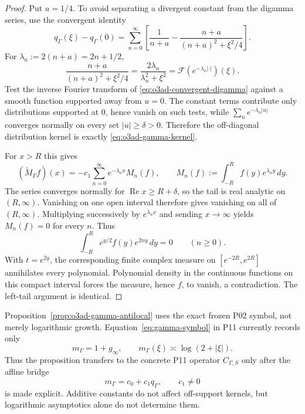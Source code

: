 \begin{proof}
Put \(a=1/4\).  To avoid separating a divergent constant from the digamma series, use
the convergent identity
\[
 q_\Gamma(\xi)-q_\Gamma(0)
 =\sum_{n=0}^\infty
 \left[
 \frac1{n+a}
 -\frac{n+a}{(n+a)^2+\xi^2/4}
 \right].
\tag{O3AD.3}\label{eq:o3ad-convergent-digamma}
\]
For \(\lambda_n:=2(n+a)=2n+1/2\),
\[
 \frac{n+a}{(n+a)^2+\xi^2/4}
 =\frac{2\lambda_n}{\lambda_n^2+\xi^2}
 =\mathcal F(e^{-\lambda_n|\cdot|})(\xi).
\]
Test the inverse Fourier transform of
\eqref{eq:o3ad-convergent-digamma} against a smooth function supported away from
\(u=0\).  The constant terms contribute only distributions supported at \(0\), hence
vanish on such tests, while
\(\sum_n e^{-\lambda_n|u|}\) converges normally on every set \(|u|\ge\delta>0\).
Therefore the off-diagonal distribution kernel is exactly
\eqref{eq:o3ad-gamma-kernel}.

For \(x>R\) this gives
\[
 (\widetilde M_\Gamma f)(x)
 =-c_1\sum_{n=0}^\infty e^{-\lambda_nx}M_n(f),
 \qquad
 M_n(f):=\int_{-R}^{R}f(y)e^{\lambda_ny}\,dy.
\tag{O3AD.4}\label{eq:o3ad-moment-tail}
\]
The series converges normally for \(\operatorname{Re}x\ge R+\delta\), so the tail is
real analytic on \((R,\infty)\).  Vanishing on one open interval therefore gives
vanishing on all of \((R,\infty)\).  Multiplying successively by
\(e^{\lambda_nx}\) and sending \(x\to\infty\) yields \(M_n(f)=0\) for every \(n\).
Thus
\[
 \int_{-R}^{R}e^{y/2}f(y)e^{2ny}\,dy=0\qquad(n\ge0).
\]
With \(t=e^{2y}\), the corresponding finite complex measure on
\([e^{-2R},e^{2R}]\) annihilates every polynomial.  Polynomial density in the
continuous functions on this compact interval forces the measure, hence \(f\), to
vanish, a contradiction.  The left-tail argument is identical.
\end{proof}

\begin{remark}
\label{rem:o3ad-symbol-interface}
Proposition~\ref{prop:o3ad-gamma-antilocal} uses the exact frozen P02 symbol, not merely
logarithmic growth.  Equation~\eqref{eq:gamma-symbol} in P11 currently records only
\[
 m_\Gamma=1+g_\infty,
 \qquad m_\Gamma(\xi)\asymp\log(2+|\xi|).
\]
Thus the proposition transfers to the concrete P11 operator \(C_{\Gamma,S}\) only
after the affine bridge
\[
 \boxed{m_\Gamma=c_0+c_1q_\Gamma,\qquad c_1\ne0}
\tag{O3AD.5}\label{eq:o3ad-symbol-bridge}
\]
is made explicit.  Additive constants do not affect off-support kernels, but
logarithmic asymptotics alone do not determine them.
\end{remark}

